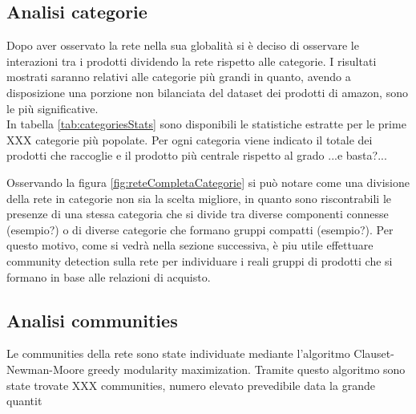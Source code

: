 \subsection{Analisi categorie}
Dopo aver osservato la rete nella sua globalità si è deciso di osservare le interazioni tra i prodotti dividendo la rete rispetto alle categorie. I risultati mostrati saranno relativi alle categorie più grandi in quanto, avendo a disposizione una porzione non bilanciata del dataset dei prodotti di amazon, sono le più significative. \\
In tabella \ref{tab:categoriesStats} sono disponibili le statistiche estratte per le prime XXX categorie più popolate. Per ogni categoria viene indicato il totale dei prodotti che raccoglie e il prodotto più centrale rispetto al grado ...e basta?...



Osservando la figura \ref{fig:reteCompletaCategorie} si può notare come una divisione della rete in categorie non sia la scelta migliore, in quanto sono riscontrabili le presenze di una stessa categoria che si divide tra diverse componenti connesse (esempio?) o di diverse categorie che formano gruppi compatti (esempio?). %
Per questo motivo, come si vedrà nella sezione successiva, è piu utile effettuare community detection sulla rete per individuare i reali gruppi di prodotti che si formano in base alle relazioni di acquisto.

\subsection{Analisi communities}
Le communities della rete sono state individuate mediante l'algoritmo Clauset-Newman-Moore greedy modularity maximization. Tramite questo algoritmo sono state trovate XXX communities, numero elevato prevedibile data la grande quantit

